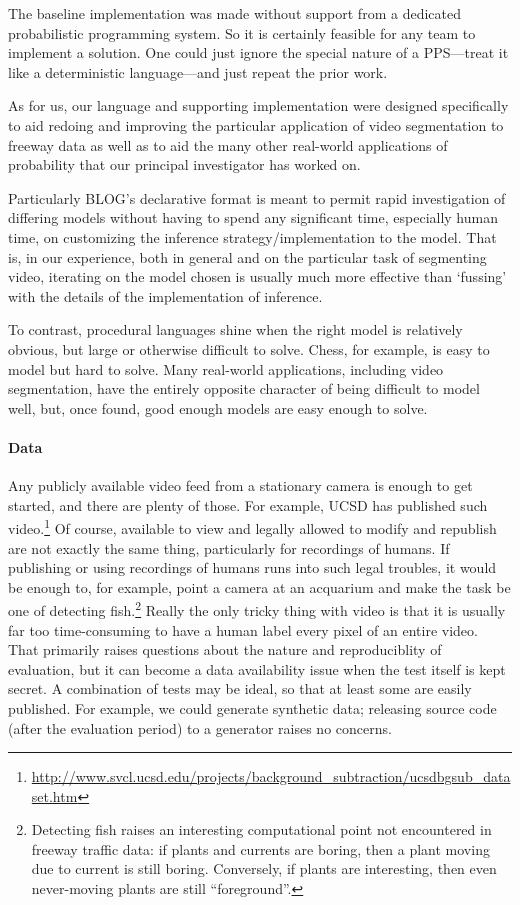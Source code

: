 The baseline implementation was made without support from a dedicated
probabilistic programming system.  So it is certainly feasible for any
team to implement a solution.  One could just ignore the special
nature of a PPS---treat it like a deterministic language---and just repeat
the prior work.

As for us, our language and supporting implementation were designed specifically
to aid redoing and improving the particular application of video segmentation to
freeway data as well as to aid the many other real-world
applications of probability that our principal investigator has worked
on.

Particularly BLOG's declarative format 
is meant to permit rapid investigation of differing models without
having to spend any significant time, especially human time, on
customizing the inference strategy/implementation to the model.  That
is, in our experience, both in general and on the particular task of
segmenting video, iterating on the model chosen is usually much more
effective than `fussing' with the details of the implementation of
inference. 

To contrast, procedural languages
shine when the right model is relatively obvious, but large or
otherwise difficult to solve. Chess, for example, is easy to model but hard to
solve.  Many real-world applications, including video segmentation,
have the entirely opposite character of being difficult to model well,
but, once found, good enough models are easy enough to solve.


\paragraph{Data}
Any publicly available video feed from a stationary camera is enough
to get started, and there are plenty of those.
For example, UCSD has published such video.\footnote{\url{http://www.svcl.ucsd.edu/projects/background_subtraction/ucsdbgsub_dataset.htm}}
Of course, available to view and legally allowed to modify and republish are not
exactly the same thing, particularly for recordings of humans.  If 
publishing or using recordings of humans runs into such legal troubles,
it would be enough to, 
for example, point a camera at an acquarium and make the task be one
of detecting fish.\footnote{Detecting fish raises an interesting
  computational point
  not encountered in freeway traffic data: if plants and currents are
  boring, then 
  a plant moving due to 
  current is still boring.  Conversely, if plants are interesting,
  then even never-moving plants are still ``foreground''.}
Really the only tricky thing with video is that it is usually far too
time-consuming to have a human label every pixel of an entire video.
That primarily raises questions about the nature and reproduciblity of
evaluation, but it can become a data availability issue when the test itself
is kept secret. A combination of tests may be ideal, so that at least
some are easily published.  For 
example, we could generate synthetic data; releasing source code
(after the evaluation period) to a generator raises no concerns.

